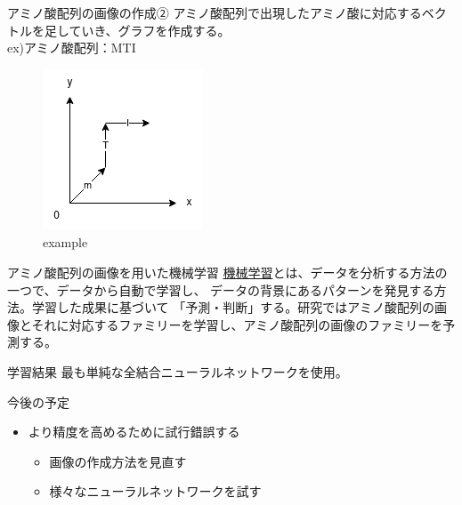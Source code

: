\documentclass[dvipdfmx]{beamer}
\begin{document}
  \begin{frame}{アミノ酸配列の画像の作成②}
    アミノ酸配列で出現したアミノ酸に対応するベクトルを足していき、グラフを作成する。\\
    ex)アミノ酸配列：MTI
    \begin{figure}
      \centering
      \includegraphics[keepaspectratio, scale=0.5]{images/example.png}
      \caption{example}
    \end{figure}
  \end{frame}

  \begin{frame}{アミノ酸配列の画像を用いた機械学習}
    \href{https://www.nri.com/jp/knowledge/glossary/lst/ka/machine_learning}{機械学習}とは、データを分析する方法の一つで、データから自動で学習し、
    データの背景にあるパターンを発見する方法。学習した成果に基づいて
    「予測・判断」する。研究ではアミノ酸配列の画像とそれに対応するファミリーを学習し、アミノ酸配列の画像のファミリーを予測する。
  \end{frame}

  \begin{frame}{学習結果}
    最も単純な全結合ニューラルネットワークを使用。
  \end{frame}

  \begin{frame}{今後の予定}
    \begin{itemize}
      \item より精度を高めるために試行錯誤する
      \begin{itemize}
        \item 画像の作成方法を見直す
        \item 様々なニューラルネットワークを試す
      \end{itemize}
    \end{itemize}
  \end{frame}
\end{document}
